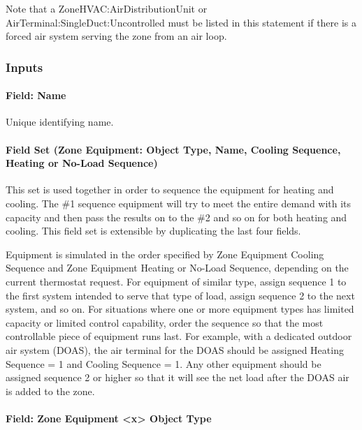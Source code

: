 Note that a ZoneHVAC:AirDistributionUnit or AirTerminal:SingleDuct:Uncontrolled must be listed in this statement if there is a forced air system serving the zone from an air loop.

\subsubsection{Inputs}\label{inputs-2-048}

\paragraph{Field: Name}\label{field-name-1-050}

Unique identifying name.

\paragraph{Field Set (Zone Equipment: Object Type, Name, Cooling Sequence, Heating or No-Load Sequence)}\label{field-set-zone-equipment-object-type-name-cooling-sequence-heating-or-no-load-sequence}

This set is used together in order to sequence the equipment for heating and cooling. The \#1 sequence equipment will try to meet the entire demand with its capacity and then pass the results on to the \#2 and so on for both heating and cooling. This field set is extensible by duplicating the last four fields.

Equipment is simulated in the order specified by Zone Equipment Cooling Sequence and Zone Equipment Heating or No-Load Sequence, depending on the current thermostat request. For equipment of similar type, assign sequence 1 to the first system intended to serve that type of load, assign sequence 2 to the next system, and so on. For situations where one or more equipment types has limited capacity or limited control capability, order the sequence so that the most controllable piece of equipment runs last. For example, with a dedicated outdoor air system (DOAS), the air terminal for the DOAS should be assigned Heating Sequence = 1 and Cooling Sequence = 1. Any other equipment should be assigned sequence 2 or higher so that it will see the net load after the DOAS air is added to the zone.

\paragraph{Field: Zone Equipment \textless{}x\textgreater{} Object Type}\label{field-zone-equipment-x-object-type}

